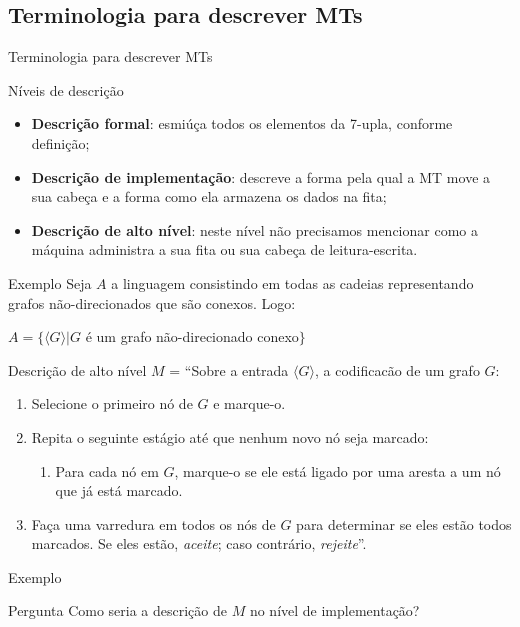 \documentclass[xcolor=dvipsnames,table]{beamer}
\begin{document}
	\subsection{Terminologia para descrever MTs}
	\begin{frame}{Terminologia para descrever MTs}
		\begin{block}{Níveis de descrição}
			\begin{itemize}
				\item<1,4> {\bf Descrição formal}: esmiúça todos os elementos da 7-upla, conforme definição;
				\item<2,4> {\bf Descrição de implementação}: descreve a forma pela qual a MT move a sua cabeça e a forma como ela armazena os dados na fita;
				\item<3,4> {\bf Descrição de alto nível}: neste nível não precisamos mencionar como a máquina administra a sua fita ou sua cabeça de leitura-escrita.
			\end{itemize}
		\end{block}
	\end{frame}
	
	\begin{frame}[shrink]{Exemplo}
		Seja $A$ a linguagem consistindo em todas as cadeias representando grafos não-direcionados que são conexos. Logo:
		\begin{center}
			$A = \{\langle G \rangle | G$ é um grafo não-direcionado conexo$\}$
		\end{center}\pause		
		\begin{block}{Descrição de alto nível}
			$M$ = ``Sobre a entrada $\langle G \rangle$, a codificacão de um grafo $G$:
			\begin{enumerate}
				\item Selecione o primeiro nó de $G$ e marque-o.
				\item Repita o seguinte estágio até que nenhum novo nó seja marcado:
				\begin{enumerate}
					\item Para cada nó em $G$, marque-o se ele está ligado por uma aresta a um nó que já está marcado.
				\end{enumerate}
				\item Faça uma varredura em todos os nós de $G$ para determinar se eles estão todos marcados. Se eles estão, {\it aceite}; caso contrário, {\it rejeite}''.
			\end{enumerate}
		\end{block}
	\end{frame}
	
	\begin{frame}{Exemplo}
		\begin{block}{Pergunta}
			Como seria a descrição de $M$ no nível de implementação?
		\end{block}
	\end{frame}
	
	\begin{frame}
		\titlepage
	\end{frame}
	
\end{document}
